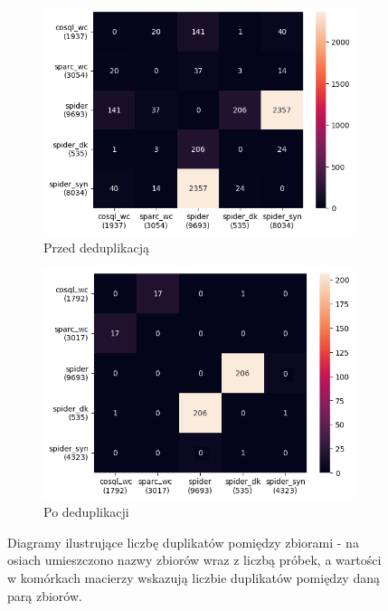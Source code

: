 \begin{figure}[ht!]
\centering
\begin{subfigure}{0.49\textwidth}
    \includegraphics[width=\textwidth]{images/duplicates_before.png}
    \caption{Przed deduplikacją}
    \label{fig:deduplication-before}
\end{subfigure}
\hfill
\begin{subfigure}{0.49\textwidth}
    \includegraphics[width=\textwidth]{images/duplicates_after.png}
    \caption{Po deduplikacji}
    \label{fig:deduplication-after}
\end{subfigure}
\caption[Diagramy ilustrujące liczbę duplikatów pomiędzy zbiorami]{Diagramy ilustrujące liczbę duplikatów pomiędzy zbiorami - na osiach umieszczono nazwy zbiorów wraz z liczbą próbek, a wartości w komórkach macierzy wskazują liczbie duplikatów pomiędzy daną parą zbiorów.}
\label{fig:cross-dataset-duplicates}
\end{figure}

